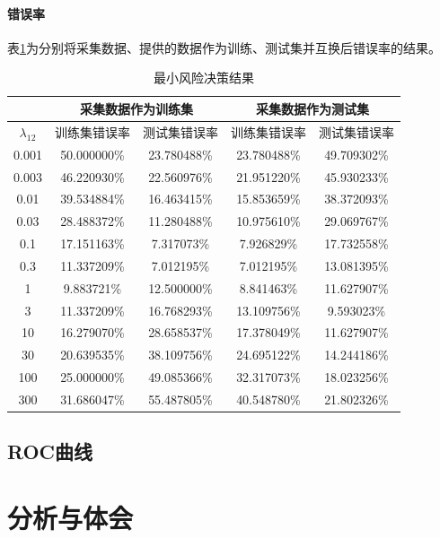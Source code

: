 \paragraph{错误率} 表\ref{tab:minrisk}为分别将采集数据、提供的数据作为训练、测试集并互换后错误率的结果。
\begin{table}
	\centering
	\begin{tabular}{|c|c|c|c|c|}
		\hline
		& \multicolumn{2}{|c|}{采集数据作为训练集} & \multicolumn{2}{|c|}{采集数据作为测试集} \\
		\hline
		$\lambda_{12}$ & 训练集错误率 & 测试集错误率 & 训练集错误率 & 测试集错误率 \\
		\hline
		0.001 & 50.000000\% & 23.780488\% & 23.780488\% & 49.709302\% \\
		0.003 & 46.220930\% & 22.560976\% & 21.951220\% & 45.930233\% \\
		0.01 & 39.534884\% & 16.463415\% & 15.853659\% & 38.372093\% \\
		0.03 & 28.488372\% & 11.280488\% & 10.975610\% & 29.069767\% \\
		0.1 & 17.151163\% & 7.317073\% & 7.926829\% & 17.732558\% \\
		0.3 & 11.337209\% & 7.012195\% & 7.012195\% & 13.081395\% \\
		1 & 9.883721\% & 12.500000\% & 8.841463\% & 11.627907\% \\
		3 & 11.337209\% & 16.768293\% & 13.109756\% & 9.593023\% \\
		10 & 16.279070\% & 28.658537\% & 17.378049\% & 11.627907\% \\
		30 & 20.639535\% & 38.109756\% & 24.695122\% & 14.244186\% \\
		100 & 25.000000\% & 49.085366\% & 32.317073\% & 18.023256\% \\
		300 & 31.686047\% & 55.487805\% & 40.548780\% & 21.802326\% \\
		\hline
	\end{tabular}
	\caption{最小风险决策结果}
	\label{tab:minrisk}
\end{table}

\subsection{ROC曲线}

\section{分析与体会}



